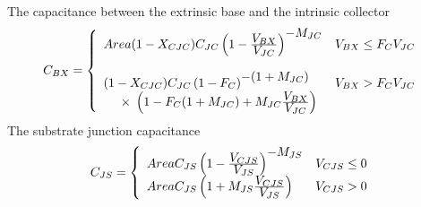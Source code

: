 The capacitance between the extrinsic base and the intrinsic collector
\begin{equation}
C_{BX} = \left\{ \begin{array}{ll}
 Area(1-X_{CJC}) C_{JC} \left(1-{{\textstyle V_{BX}}\over
   {\textstyle V_{JC}}}\right)^{\textstyle -M_{JC}}
   & V_{BX} \le F_C V_{JC}\\ \\
 (1-X_{CJC})
   C_{JC} \left(1-F_C\right)^{\textstyle -(1+M_{JC})}
   & V_{BX} > F_C V_{JC}\\
   \;\;\;\;\;\times\; \left(1-F_C(1+M_{JC})+M_{JC}{{\textstyle V_{BX}}\over
   {\textstyle V_{JC}}} \right)
   &
   \end{array} \right. %
\end{equation}
The substrate junction capacitance
\begin{equation}
C_{JS} = \left\{ \begin{array}{ll}
 Area C_{JS} \left(1-{{\textstyle V_{CJS}}\over
   {\textstyle V_{JS}}}\right)^{\textstyle -M_{JS}}
   & V_{CJS} \le 0\\
   Area C_{JS}
   \left(1+M_{JS}{{\textstyle V_{CJS}}\over
   {\textstyle V_{JS}}} \right)
   & V_{CJS} > 0
   \end{array} \right. %
\end{equation}

